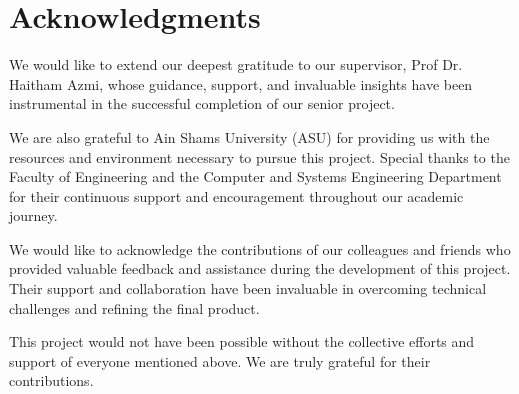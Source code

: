 \chapter*{Acknowledgments}
\label{chap:ack}

We would like to extend our deepest gratitude to our supervisor, Prof
Dr. Haitham Azmi, whose guidance, support, and invaluable insights have been
instrumental in the successful completion of our senior project.

We are also grateful to Ain Shams University (ASU) for providing us with the
resources and environment necessary to pursue this project. Special thanks to
the Faculty of Engineering and the Computer and Systems Engineering Department
for their continuous support and encouragement throughout our academic journey.

We would like to acknowledge the contributions of our colleagues and friends
who provided valuable feedback and assistance during the development of this
project. Their support and collaboration have been invaluable in overcoming
technical challenges and refining the final product.


This project would not have been possible without the collective efforts and
support of everyone mentioned above. We are truly grateful for their
contributions.
